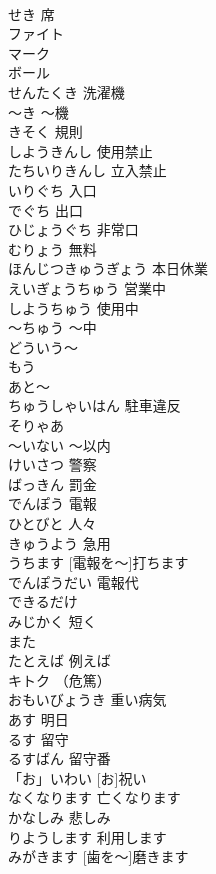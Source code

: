 \documentclass[8pt]{extreport}
\begin{document}
\begin{CJK}{UTF8}{min}
\\	せき	席	
\\	ファイト			
\\	マーク			
\\	ボール			
\\	せんたくき	洗濯機	
\\	～き	～機	
\\	きそく	規則	
\\	しようきんし	使用禁止	
\\	たちいりきんし	立入禁止	
\\	いりぐち	入口	
\\	でぐち	出口	
\\	ひじょうぐち	非常口	
\\	むりょう	無料	
\\	ほんじつきゅうぎょう	本日休業	
\\	えいぎょうちゅう	営業中	
\\	しようちゅう	使用中	
\\	～ちゅう	～中	
\\	どういう～			
\\	もう			
\\	あと～			
\\	ちゅうしゃいはん	駐車違反	
\\	そりゃあ			
\\	～いない	～以内	
\\	けいさつ	警察	
\\	ばっきん	罰金	
\\	でんぽう	電報	
\\	ひとびと	人々	
\\	きゅうよう	急用	
\\	うちます	[電報を～]打ちます	
\\	でんぽうだい	電報代	
\\	できるだけ			
\\	みじかく	短く	
\\	また			
\\	たとえば	例えば	
\\	キトク	（危篤）	
\\	おもいびょうき	重い病気	
\\	あす	明日	
\\	るす	留守	
\\	るすばん	留守番	
\\	「お」いわい	[お]祝い	
\\	なくなります	亡くなります	
\\	かなしみ	悲しみ	
\\	りようします	利用します	
\\	[はを～]みがきます	[歯を～]磨きます	

\end{CJK}
\end{document}
